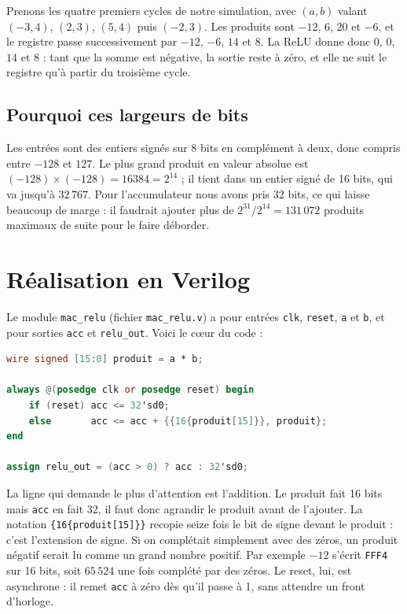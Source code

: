 \documentclass[11pt,a4paper]{article}
\begin{document}
Prenons les quatre premiers cycles de notre simulation, avec $(a,b)$ valant
$(-3,4)$, $(2,3)$, $(5,4)$ puis $(-2,3)$. Les produits sont $-12$, $6$, $20$ et
$-6$, et le registre passe successivement par $-12$, $-6$, $14$ et $8$. La ReLU
donne donc $0$, $0$, $14$ et $8$ : tant que la somme est négative, la sortie reste
à zéro, et elle ne suit le registre qu'à partir du troisième cycle.

\subsection{Pourquoi ces largeurs de bits}

Les entrées sont des entiers signés sur 8 bits en complément à deux, donc compris
entre $-128$ et $127$. Le plus grand produit en valeur absolue est
$(-128)\times(-128)=16384=2^{14}$ ; il tient dans un entier signé de 16 bits, qui
va jusqu'à $32\,767$. Pour l'accumulateur nous avons pris 32 bits, ce qui laisse
beaucoup de marge : il faudrait ajouter plus de $2^{31}/2^{14}=131\,072$ produits
maximaux de suite pour le faire déborder.

\section{Réalisation en Verilog}

Le module \texttt{mac\_relu} (fichier \texttt{mac\_relu.v}) a pour entrées
\texttt{clk}, \texttt{reset}, \texttt{a} et \texttt{b}, et pour sorties \texttt{acc}
et \texttt{relu\_out}. Voici le c\oe ur du code :

\begin{lstlisting}[language=Verilog,morekeywords={always,posedge,assign,wire,signed}]
wire signed [15:0] produit = a * b;

always @(posedge clk or posedge reset) begin
    if (reset) acc <= 32'sd0;
    else       acc <= acc + {{16{produit[15]}}, produit};
end

assign relu_out = (acc > 0) ? acc : 32'sd0;
\end{lstlisting}

La ligne qui demande le plus d'attention est l'addition. Le produit fait 16 bits
mais \texttt{acc} en fait 32, il faut donc agrandir le produit avant de l'ajouter.
La notation \verb|{16{produit[15]}}| recopie seize fois le bit de signe devant le
produit : c'est l'extension de signe. Si on complétait simplement avec des zéros,
un produit négatif serait lu comme un grand nombre positif. Par exemple $-12$
s'écrit \texttt{FFF4} sur 16 bits, soit $65\,524$ une fois complété par des zéros.
Le reset, lui, est asynchrone : il remet \texttt{acc} à zéro dès qu'il passe à 1,
sans attendre un front d'horloge.
\end{document}
